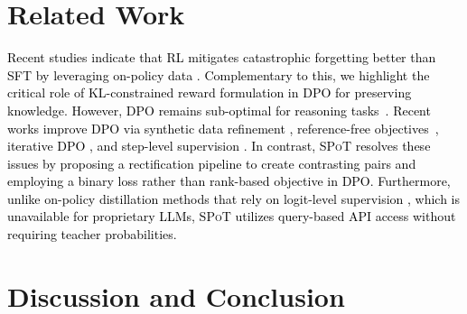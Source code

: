 \documentclass{article}
\newcommand{\methodName}{{\textsc{SPoT}}\xspace}
\newcommand{\modify}[1]{\textcolor{black}{#1}} %
\theoremstyle{plain}
\theoremstyle{definition}
\theoremstyle{remark}
\begin{document}
\section{Related Work}
\modify{Recent studies indicate that RL mitigates catastrophic forgetting better than SFT by leveraging on-policy data \citep{shenfeld2025rl, chen2025retaining}. Complementary to this, we highlight the critical role of KL-constrained reward formulation in DPO for preserving knowledge. However, DPO remains sub-optimal for reasoning tasks~\citep{renlearning,azar2024general}. Recent works improve DPO via synthetic data refinement \citep{pal2024smaug}, reference-free objectives~\citep{hong2024orpo,meng2024simpo}, iterative DPO \citep{chen2024self,pang2024iterative}, and step-level supervision \citep{lai2024step}. In contrast, \methodName resolves these issues by proposing a rectification pipeline to create contrasting pairs and employing a binary loss rather than rank-based objective in DPO. Furthermore, unlike on-policy distillation methods that rely on logit-level supervision \citep{agarwal2024policy, lu2025onpolicydistillation}, which is unavailable for proprietary LLMs, \methodName utilizes query-based API access without requiring teacher probabilities.}

\section{Discussion and Conclusion}






\end{document}
